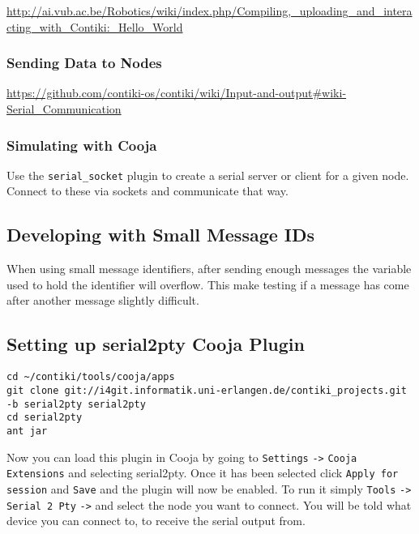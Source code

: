 \url{http://ai.vub.ac.be/Robotics/wiki/index.php/Compiling,_uploading_and_interacting_with_Contiki:_Hello_World}

\subsubsection{Sending Data to Nodes}

\url{https://github.com/contiki-os/contiki/wiki/Input-and-output#wiki-Serial_Communication}


\subsubsection{Simulating with Cooja}

Use the \verb|serial_socket| plugin to create a serial server or client for a given node. Connect to these via sockets and communicate that way.

\subsection{Developing with Small Message IDs}

When using small message identifiers, after sending enough messages the variable used to hold the identifier will overflow. This make testing if a message has come after another message slightly difficult.

\subsection{Setting up serial2pty Cooja Plugin}

\begin{listing}[H]
\begin{verbatim}
cd ~/contiki/tools/cooja/apps
git clone git://i4git.informatik.uni-erlangen.de/contiki_projects.git -b serial2pty serial2pty
cd serial2pty
ant jar
\end{verbatim}
\end{listing}

Now you can load this plugin in Cooja by going to \verb|Settings| \verb|->| \verb|Cooja Extensions| and selecting serial2pty. Once it has been selected click \verb|Apply for session| and \verb|Save| and the plugin will now be enabled. To run it simply \verb|Tools| \verb|->| \verb| Serial 2 Pty| \verb|->| and select the node you want to connect. You will be told what device you can connect to, to receive the serial output from.

